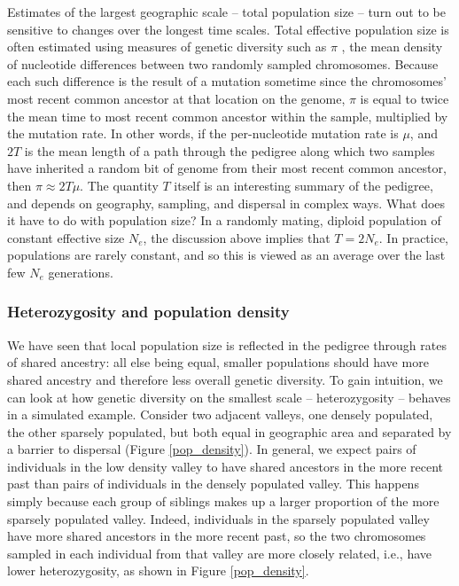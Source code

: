 \documentclass{ar-1col}
\begin{document}
Estimates of the largest geographic scale -- total population size --
turn out to be sensitive to changes over the longest time scales.
Total effective population size is often estimated using measures of genetic diversity such as $\pi$ \citep{NeiLi1979,Tajima89},
the mean density of nucleotide differences between two randomly sampled chromosomes.
Because each such difference is the result of a mutation
sometime since the chromosomes' most recent common ancestor at that location on the genome,
$\pi$ is equal to twice the mean time to most recent common ancestor
within the sample, multiplied by the mutation rate.
In other words, if the per-nucleotide mutation rate is $\mu$,
and $2T$ is the mean length of a path through the pedigree
along which two samples have inherited a random bit of genome
from their most recent common ancestor,
then $\pi \approx 2 T \mu$.
The quantity $T$ itself is an interesting summary of the pedigree,
and depends on geography, sampling, and dispersal in complex ways.
What does it have to do with population size?
In a randomly mating, diploid population of constant effective size $N_e$,
the discussion above implies that $T = 2N_e$.
In practice, populations are rarely constant, and so this is viewed as an average
over the last few $N_e$ generations.



\subsubsection{Heterozygosity and population density}

We have seen that
local population size is reflected in the pedigree through rates of shared ancestry:
all else being equal, smaller populations should have more shared ancestry and 
therefore less overall genetic diversity.
To gain intuition, we can look at how genetic diversity on the smallest scale
-- heterozygosity --
behaves in a simulated example.
Consider two adjacent valleys, 
one densely populated, the other sparsely populated, 
but both equal in geographic area 
and separated by a barrier to dispersal (Figure \ref{pop_density}).
In general, we expect pairs of individuals in the low density valley 
to have shared ancestors in the more recent past than 
pairs of individuals in the densely populated valley.
This happens simply because 
each group of siblings makes up a larger proportion 
of the more sparsely populated valley.
Indeed, individuals in the sparsely populated valley 
have more shared ancestors in the more recent past, 
so the two chromosomes sampled in each individual 
from that valley are more closely related,
i.e., have lower heterozygosity, as shown in Figure \ref{pop_density}.
\end{document}
